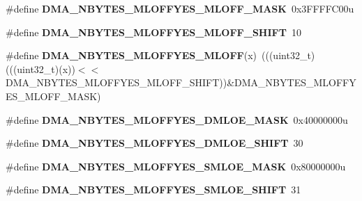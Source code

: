 \begin{DoxyCompactItemize}
\item 
\#define {\bfseries D\+M\+A\+\_\+\+N\+B\+Y\+T\+E\+S\+\_\+\+M\+L\+O\+F\+F\+Y\+E\+S\+\_\+\+M\+L\+O\+F\+F\+\_\+\+M\+A\+SK}~0x3\+F\+F\+F\+F\+C00u\hypertarget{group__DMA__Register__Masks_gac07412f8b58bca6703cf427a9ce2bbcb}{}\label{group__DMA__Register__Masks_gac07412f8b58bca6703cf427a9ce2bbcb}

\item 
\#define {\bfseries D\+M\+A\+\_\+\+N\+B\+Y\+T\+E\+S\+\_\+\+M\+L\+O\+F\+F\+Y\+E\+S\+\_\+\+M\+L\+O\+F\+F\+\_\+\+S\+H\+I\+FT}~10\hypertarget{group__DMA__Register__Masks_gaeebd8fdf6a54f6511b5bc65a6b139545}{}\label{group__DMA__Register__Masks_gaeebd8fdf6a54f6511b5bc65a6b139545}

\item 
\#define {\bfseries D\+M\+A\+\_\+\+N\+B\+Y\+T\+E\+S\+\_\+\+M\+L\+O\+F\+F\+Y\+E\+S\+\_\+\+M\+L\+O\+FF}(x)~(((uint32\+\_\+t)(((uint32\+\_\+t)(x))$<$$<$D\+M\+A\+\_\+\+N\+B\+Y\+T\+E\+S\+\_\+\+M\+L\+O\+F\+F\+Y\+E\+S\+\_\+\+M\+L\+O\+F\+F\+\_\+\+S\+H\+I\+FT))\&D\+M\+A\+\_\+\+N\+B\+Y\+T\+E\+S\+\_\+\+M\+L\+O\+F\+F\+Y\+E\+S\+\_\+\+M\+L\+O\+F\+F\+\_\+\+M\+A\+SK)\hypertarget{group__DMA__Register__Masks_ga9f73c3351f2fff2e2c04b2a03fabd506}{}\label{group__DMA__Register__Masks_ga9f73c3351f2fff2e2c04b2a03fabd506}

\item 
\#define {\bfseries D\+M\+A\+\_\+\+N\+B\+Y\+T\+E\+S\+\_\+\+M\+L\+O\+F\+F\+Y\+E\+S\+\_\+\+D\+M\+L\+O\+E\+\_\+\+M\+A\+SK}~0x40000000u\hypertarget{group__DMA__Register__Masks_ga76a7714303966593beffe85120eb3620}{}\label{group__DMA__Register__Masks_ga76a7714303966593beffe85120eb3620}

\item 
\#define {\bfseries D\+M\+A\+\_\+\+N\+B\+Y\+T\+E\+S\+\_\+\+M\+L\+O\+F\+F\+Y\+E\+S\+\_\+\+D\+M\+L\+O\+E\+\_\+\+S\+H\+I\+FT}~30\hypertarget{group__DMA__Register__Masks_ga6a2d840f400f7f2e0bff92c1696d933b}{}\label{group__DMA__Register__Masks_ga6a2d840f400f7f2e0bff92c1696d933b}

\item 
\#define {\bfseries D\+M\+A\+\_\+\+N\+B\+Y\+T\+E\+S\+\_\+\+M\+L\+O\+F\+F\+Y\+E\+S\+\_\+\+S\+M\+L\+O\+E\+\_\+\+M\+A\+SK}~0x80000000u\hypertarget{group__DMA__Register__Masks_ga3fc0c1eff32a41d0111c33ae3ba4c130}{}\label{group__DMA__Register__Masks_ga3fc0c1eff32a41d0111c33ae3ba4c130}

\item 
\#define {\bfseries D\+M\+A\+\_\+\+N\+B\+Y\+T\+E\+S\+\_\+\+M\+L\+O\+F\+F\+Y\+E\+S\+\_\+\+S\+M\+L\+O\+E\+\_\+\+S\+H\+I\+FT}~31\hypertarget{group__DMA__Register__Masks_ga35f2f83a6af667046813440107156960}{}\label{group__DMA__Register__Masks_ga35f2f83a6af667046813440107156960}


\end{DoxyCompactItemize}
